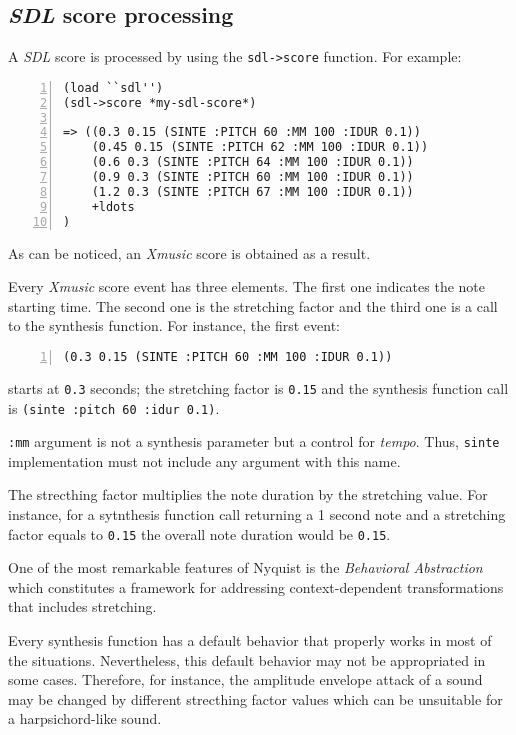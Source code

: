 \subsection{\textit{SDL} score processing}
 A  \textit{SDL} score is processed by using the \texttt{sdl->score} function. For example:
\begin{Verbatim}[frame=single,fontsize=\small,numbers=left,numbersep=2mm,
  commandchars=+\[\]]
(load ``sdl'')
(sdl->score *my-sdl-score*)

=> ((0.3 0.15 (SINTE :PITCH 60 :MM 100 :IDUR 0.1))
    (0.45 0.15 (SINTE :PITCH 62 :MM 100 :IDUR 0.1))
    (0.6 0.3 (SINTE :PITCH 64 :MM 100 :IDUR 0.1)) 
    (0.9 0.3 (SINTE :PITCH 60 :MM 100 :IDUR 0.1)) 
    (1.2 0.3 (SINTE :PITCH 67 :MM 100 :IDUR 0.1))
    +ldots
)
\end{Verbatim} 


As can be noticed, an {\it Xmusic} score is obtained as a result.

Every {\it Xmusic} score event has three elements. The first one indicates the note starting time. The second one is the stretching factor and the third one is a call to the synthesis function. For instance, the first event:

\begin{Verbatim}[frame=single,fontsize=\small,numbers=left,numbersep=2mm]
(0.3 0.15 (SINTE :PITCH 60 :MM 100 :IDUR 0.1))
\end{Verbatim}
starts at {\tt 0.3} seconds; the stretching factor is {\tt 0.15} and the synthesis function call is \texttt{(sinte :pitch 60 :idur 0.1)}.\par


\texttt{:mm}  argument is not a synthesis parameter but a control for {\it tempo}. Thus, {\tt sinte} implementation must not include any argument with this name.


The strecthing factor multiplies the note duration by the stretching value. For instance, for a sytnthesis function call returning a 1 second note and a stretching factor equals to {\tt 0.15} the overall note duration would be {\tt 0.15}.

One of the most remarkable features of Nyquist is the
\textit{Behavioral Abstraction} which constitutes a framework for
addressing context-dependent transformations that includes stretching.

Every synthesis function has a default behavior that properly works in
most of the situations. Nevertheless, this default behavior may not
be appropriated in some cases. Therefore, for instance, the amplitude
envelope attack of a sound may be changed by different strecthing factor
values which can be unsuitable for a harpsichord-like sound.

